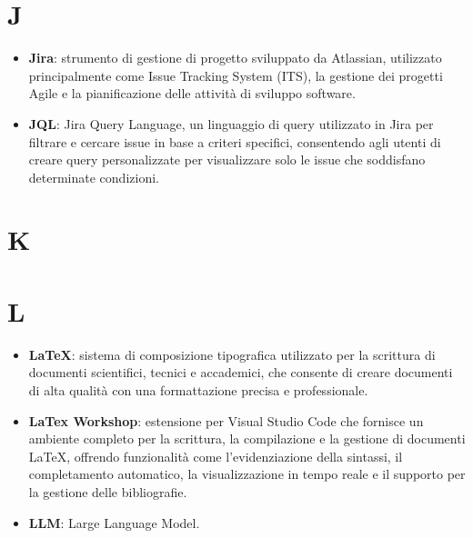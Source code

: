 \documentclass[a4paper,12pt]{article}
\begin{document}
\section{J}
\begin{itemize}
    \item \textbf{Jira}: strumento di gestione di progetto sviluppato da Atlassian, utilizzato principalmente come Issue Tracking System (ITS), la gestione dei progetti Agile e la pianificazione delle attività di sviluppo software.
    \item \textbf{JQL}: Jira Query Language, un linguaggio di query utilizzato in Jira per filtrare e cercare issue in base a criteri specifici, consentendo agli utenti di creare query personalizzate per visualizzare solo le issue che soddisfano determinate condizioni.
\end{itemize}
\section{K}
\section{L}
\begin{itemize}
    \item \textbf{LaTeX}: sistema di composizione tipografica utilizzato per la scrittura di documenti scientifici, tecnici e accademici, che consente di creare documenti di alta qualità con una formattazione precisa e professionale.
    \item \textbf{LaTex Workshop}: estensione per Visual Studio Code che fornisce un ambiente completo per la scrittura, la compilazione e la gestione di documenti LaTeX, offrendo funzionalità come l'evidenziazione della sintassi, il completamento automatico, la visualizzazione in tempo reale e il supporto per la gestione delle bibliografie.
    \item \textbf{LLM}: Large Language Model.
\end{itemize}
\end{document}
